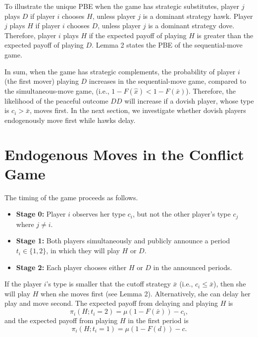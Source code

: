 \documentclass[12pt,english]{article}
\begin{document}
To illustrate the unique PBE when the game has strategic substitutes, player $j$ plays $D$ if player $i$ chooses $H$, unless player $j$ is a dominant strategy hawk. Player $j$ plays $H$ if player $i$ chooses $D$, unless player $j$ is a dominant strategy dove. Therefore, player $i$ plays $H$ if the expected payoff of playing $H$ is greater than the expected payoff of playing $D$. Lemma 2 states the PBE of the sequential-move game.\par
In sum, when the game has strategic complements, the probability of player $i$ (the first mover) playing $D$ increases in the sequential-move game, compared to the simultaneous-move game, (i.e., $1-F(\hat{x})<1-F(\bar{x})$). Therefore, the likelihood of the peaceful outcome $DD$ will increase if a dovish player, whose type is $c_i> \bar{x}$, moves first. In the next section, we investigate whether dovish players endogenously move first while hawks delay. 


\section{Endogenous Moves in the Conflict Game}

The timing of the game proceeds as follows.

\begin{itemize}\itemsep-2pt
\item \textbf{Stage 0:} Player $i$ observes her type $c_i$, but not the other player's type $c_j$ where $j\neq i$.

\item \textbf{Stage 1:} Both players simultaneously and publicly announce a period $t_{i}\in\{1,2\}$, in which they will play $H$ or $D$.
\item \textbf{Stage 2:} Each player chooses either $H$ or $D$ in the announced periods.
\end{itemize}\par

If the player $i$'s type is smaller that the cutoff strategy $\bar{x}$ (i.e., $c_i \leq \bar{x}$), then she will play $H$ when she moves first (see Lemma 2). Alternatively, she can delay her play and move second. The expected payoff from delaying and playing $H$ is 
\begin{equation}
   \pi_i(H;t_i=2)=\mu(1-F(\bar{x}))-c_i, \label{pihII}
\end{equation}
and the expected payoff from playing $H$ in the first period is
\begin{equation}
    \pi_i(H;t_i=1)=\mu(1-F(d))-c \label{pihI}.
\end{equation}\par
\end{document}
